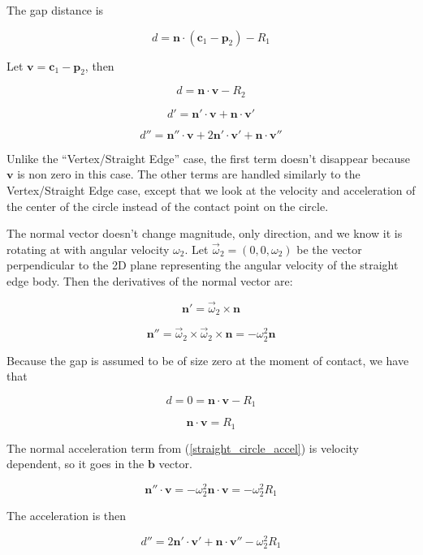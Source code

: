 \documentclass[final]{article}
\begin{document}
The gap distance is

\[
  d = \mathbf{n} \cdot (\mathbf{c}_1 - \mathbf{p}_2) - R_1
\]

Let $\mathbf{v} = \mathbf{c}_1 - \mathbf{p}_2$, then

\[
  d = \mathbf{n} \cdot \mathbf{v}  - R_2
\]

\[
  d' = \mathbf{n}' \cdot \mathbf{v} + \mathbf{n} \cdot \mathbf{v}'
\]

\begin{equation}\label{straight_circle_accel}
  d'' = \mathbf{n}'' \cdot \mathbf{v} + 2 \mathbf{n}' \cdot \mathbf{v}'
      + \mathbf{n} \cdot \mathbf{v}''
\end{equation}

Unlike the ``Vertex/Straight Edge'' case, the first term doesn't disappear because
$\mathbf{v}$ is non zero in this case. The other terms are handled similarly to the
Vertex/Straight Edge case, except that we look at the velocity and acceleration of the
center of the circle instead of the contact point on the circle.

The normal vector doesn't change magnitude, only direction, and we know it is rotating
at with angular velocity $\omega_2$. Let $\vec{\omega}_2 = (0, 0, \omega_2)$ be the
vector perpendicular to the 2D plane representing the angular velocity of the straight
edge body. Then the derivatives of the normal vector are:

\[
  \mathbf{n}' = \vec{\omega}_2 \times \mathbf{n}
\]

\[
  \mathbf{n}'' = \vec{\omega}_2 \times \vec{\omega}_2 \times \mathbf{n}
               = - \omega_2^2 \mathbf{n}
\]

Because the gap is assumed to be of size zero at the moment of contact, we have that

\[
  d = 0 = \mathbf{n} \cdot \mathbf{v} - R_1
\]

\[
  \mathbf{n} \cdot \mathbf{v} = R_1
\]

The normal acceleration term from (\ref{straight_circle_accel}) is velocity dependent,
so it goes in the $\mathbf{b}$ vector.

\[
  \mathbf{n}'' \cdot \mathbf{v} = - \omega_2^2 \mathbf{n} \cdot \mathbf{v}
    = - \omega_2^2 R_1
\]

The acceleration is then

\begin{equation}\label{straight_circle_accel_2}
  d'' =  2 \mathbf{n}' \cdot \mathbf{v}'
      + \mathbf{n} \cdot \mathbf{v}'' - \omega_2^2 R_1
\end{equation}
\end{document}
